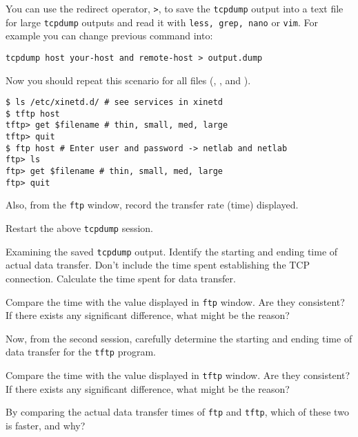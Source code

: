 \documentclass{../UTNetLab}
\begin{document}
    You can use the redirect operator, \lstinline{>}, to save the \lstinline{tcpdump} output into a text file for large \lstinline{tcpdump} outputs and read it with \lstinline{less, grep, nano} or \lstinline{vim}.
    For example you can change previous command into:
    \begin{lstlisting}[emph={your-host,remote-host,output,dump}]
tcpdump host your-host and remote-host > output.dump
    \end{lstlisting}
    
    Now you should repeat this scenario for all files (, ,  and ).
    \begin{lstlisting}[emph={host}]
$ ls /etc/xinetd.d/ # see services in xinetd
$ tftp host
tftp> get $filename # thin, small, med, large
tftp> quit
$ ftp host # Enter user and password -> netlab and netlab
ftp> ls
ftp> get $filename # thin, small, med, large
ftp> quit
    \end{lstlisting}

    Also, from the \lstinline{ftp} window, record the transfer rate (time) displayed. 

    Restart the above \lstinline{tcpdump} session.

    \begin{report}
    \item Examining the saved \lstinline{tcpdump} output. Identify the starting and ending time of actual data transfer.
    Don’t include the time spent establishing the TCP connection.
    Calculate the time spent for data transfer. 

    \item Compare the time with the value displayed in \lstinline{ftp} window.
    Are they consistent?
    If there exists any significant difference, what might be the reason? 

    \item Now, from the second session, carefully determine the starting and ending time of data transfer for the \lstinline{tftp} program. 

    \item Compare the time with the value displayed in \lstinline{tftp} window.
    Are they consistent?
    If there exists any significant difference, what might be the reason? 

    \item By comparing the actual data transfer times of \lstinline{ftp} and \lstinline{tftp}, which of these two is faster, and why?
    \end{report}
\end{document}
